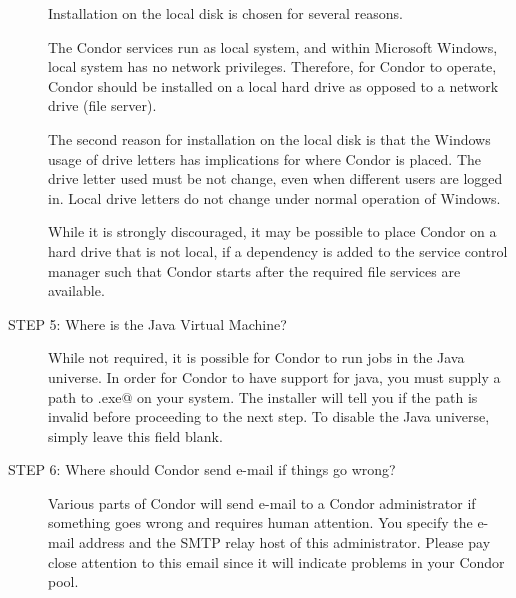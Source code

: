 \begin{description}
Installation on the local disk is chosen for several reasons.

The Condor services run as local system, and within Microsoft Windows, local system has no network privileges.
Therefore, for Condor to operate, Condor should be installed on a local hard drive as opposed to a network drive (file server).

The second reason for installation on the local disk is that
the Windows usage of drive letters has implications for where
Condor is placed.
The drive letter used must be not change, even when different users are
logged in.
Local drive letters do not change under normal operation of Windows.

While it is strongly discouraged, it may be possible to place Condor on a hard drive that is not local,  if a dependency is added to the service control manager
such that Condor starts after the required file services
are available.



\item[STEP 5: Where is the Java Virtual Machine?]
	While not required, it is possible for Condor to run jobs in the
	Java universe. In order for Condor to have support for java,
	you must supply a path to \verb@java.exe@ on your system. The
	installer will tell you if the path is invalid before proceeding
	to the next step. To disable the Java universe, simply leave
	this field blank.

\item[STEP 6: Where should Condor send e-mail if things go wrong?]

     Various parts of Condor will send e-mail to a Condor administrator
     if something goes wrong and requires human attention.
     You specify the e-mail address and the SMTP relay host
     of this administrator.  Please pay close attention to this email
	 since it will indicate problems in your Condor pool.


\end{description}
